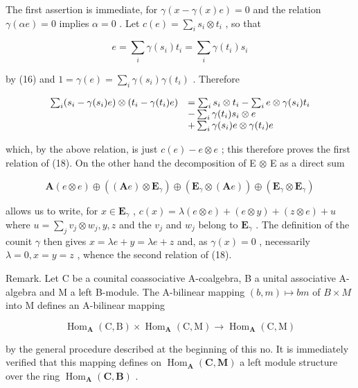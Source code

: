 The first assertion is immediate, for \(\gamma(x - \gamma(x)e) = 0\) and the relation \(\gamma(\alpha e) = 0\) implies \(\alpha = 0\) . Let \(c(e) = \sum_{i} s_i \otimes t_i\) , so that

\[
e = \sum_ {i} \gamma (s _ {i}) t _ {i} = \sum_ {i} \gamma (t _ {i}) s _ {i}
\]

by (16) and \(1 = \gamma(e) = \sum_{i} \gamma(s_i) \gamma(t_i)\) . Therefore

\[
\begin{array}{r l} \sum_ {i} (s _ {i} - \gamma (s _ {i}) e) \otimes (t _ {i} - \gamma (t _ {i}) e) & = \sum_ {i} s _ {i} \otimes t _ {i} - \sum_ {i} e \otimes \gamma (s _ {i}) t _ {i} \\ & - \sum_ {i} \gamma (t _ {i}) s _ {i} \otimes e \\ & + \sum_ {i} \gamma (s _ {i}) e \otimes \gamma (t _ {i}) e \end{array}
\]

which, by the above relation, is just \(c(e) - e \otimes e\) ; this therefore proves the first relation of (18). On the other hand the decomposition of E \(\otimes\) E as a direct sum

\[
\mathbf {A} (e \otimes e) \oplus ((\mathbf {A} e) \otimes \mathbf {E} _ {\gamma}) \oplus (\mathbf {E} _ {\gamma} \otimes (\mathbf {A} e)) \oplus (\mathbf {E} _ {\gamma} \otimes \mathbf {E} _ {\gamma})
\]

allows us to write, for \(x \in \mathbf{E}_{\gamma}\) , \(c(x) = \lambda(e \otimes e) + (e \otimes y) + (z \otimes e) + u\) where \(u = \sum_{j} v_{j} \otimes w_{j}, y, z\) and the \(v_{j}\) and \(w_{j}\) belong to \(\mathbf{E}_{\gamma}\) . The definition of the counit \(\gamma\) then gives \(x = \lambda e + y = \lambda e + z\) and, as \(\gamma(x) = 0\) , necessarily \(\lambda = 0, x = y = z\) , whence the second relation of (18).

Remark. Let C be a counital coassociative A-coalgebra, B a unital associative A-algebra and M a left B-module. The A-bilinear mapping \((b, m) \mapsto bm\) of \(B \times M\) into M defines an A-bilinear mapping

\[
\operatorname{Hom} _ {\mathbf {A}} (\mathrm{C}, \mathrm{B}) \times \operatorname{Hom} _ {\mathbf {A}} (\mathrm{C}, \mathrm{M}) \rightarrow \operatorname{Hom} _ {\mathbf {A}} (\mathrm{C}, \mathrm{M})
\]

by the general procedure described at the beginning of this no. It is immediately verified that this mapping defines on \(\operatorname{Hom}_{\mathbf{A}}(\mathbf{C}, \mathbf{M})\) a left module structure over the ring \(\operatorname{Hom}_{\mathbf{A}}(\mathbf{C}, \mathbf{B})\) .

